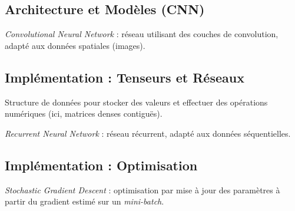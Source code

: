 \documentclass[a4paper,11pt]{article}
\begin{document}
\subsection*{Architecture et Modèles (CNN)}
\begin{description}[style=multiline, leftmargin=3cm, font=\bfseries]
\item[CNN] \textit{Convolutional Neural Network} : réseau utilisant des couches de convolution, adapté aux données spatiales (images).
\end{description}

\subsection*{Implémentation : Tenseurs et Réseaux}
\begin{description}[style=multiline, leftmargin=3cm, font=\bfseries]
\item[Tensor/Matrix] Structure de données pour stocker des valeurs et effectuer des opérations numériques (ici, matrices denses contiguës).
\item[RNN] \textit{Recurrent Neural Network} : réseau récurrent, adapté aux données séquentielles.
\end{description}

\subsection*{Implémentation : Optimisation}
\begin{description}[style=multiline, leftmargin=3cm, font=\bfseries]
\item[SGD] \textit{Stochastic Gradient Descent} : optimisation par mise à jour des paramètres à partir du gradient estimé sur un \textit{mini-batch}.
\end{description}
\end{document}
